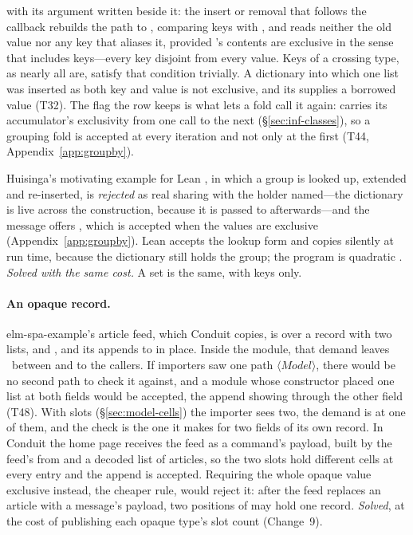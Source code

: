 with its argument written beside it: the insert or removal that follows the callback rebuilds the path to , comparing keys with
, and reads neither the old value nor any key that aliases it, provided 's contents
are exclusive in the sense that includes keys---every key disjoint from every value. Keys of a crossing
type, as nearly all are, satisfy that condition trivially. A dictionary into which one list was inserted
as both key and value is not exclusive, and its  supplies a borrowed value (T32). The flag
the row keeps is what lets a fold call it again:  carries its accumulator's exclusivity from
one call to the next (\S\ref{sec:inf-classes}), so a grouping fold is accepted at every iteration and not
only at the first (T44, Appendix~\ref{app:groupby}).

Huisinga's motivating example for Lean \citep[\S2.1]{huisinga2023lean}, in which a group is looked up,
extended and re-inserted, is \emph{rejected} as real sharing with the holder named---the dictionary is
live across the construction, because it is passed to  afterwards---and the message offers
, which is accepted when the values are exclusive (Appendix~\ref{app:groupby}). Lean
accepts the lookup form and copies silently at run time, because the dictionary still holds the group;
the program is quadratic \citep[\S2.4]{huisinga2023lean}. \emph{Solved with the same cost.} A set is the
same, with keys only.

\paragraph{An opaque record.} elm-spa-example's article feed, which Conduit copies, is
 over a record with two lists,  and
, and its  appends to  in place. Inside the module, that demand
leaves \Disjoint\ between  and  to the callers. If importers saw one path
$\langle\mathit{Model}\rangle$, there would be no second path to check it against, and a module whose
constructor placed one list at both fields would be accepted, the append showing through the other field
(T48). With slots (\S\ref{sec:model-cells}) the importer sees two, the demand is at one of them, and the
check is the one it makes for two fields of its own record. In Conduit the home page receives the feed as
a command's payload, built by the feed's  from  and a decoded list of
articles, so the two slots hold different cells at every entry and the append is accepted. Requiring the
whole opaque value exclusive instead, the cheaper rule, would reject it: after the feed replaces an
article with a message's payload, two positions of  may hold one record.
\emph{Solved}, at the cost of publishing each opaque type's slot count (Change~9).

